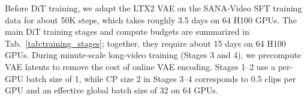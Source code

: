 Before DiT training, we adapt the LTX2 VAE on the SANA-Video SFT training data for about 50K steps, which takes roughly 3.5 days on 64 H100 GPUs. The main DiT training stages and compute budgets are summarized in Tab.~\ref{tab:training_stages}; together, they require about 15 days on 64 H100 GPUs. During minute-scale long-video training (Stages 3 and 4), we precompute VAE latents to remove the cost of online VAE encoding. Stages 1--2 use a per-GPU batch size of 1, while CP size 2 in Stages 3--4 corresponds to 0.5 clips per GPU and an effective global batch size of 32 on 64 GPUs.

\begin{table}[htbp]
  \centering
  \caption{Training schedule and hyperparameters for the progressive DiT/backbone training pipeline. All stages use AdamW, BF16 mixed precision, and gradient clipping at 0.5.}
  \label{tab:training_stages}
\end{table}


